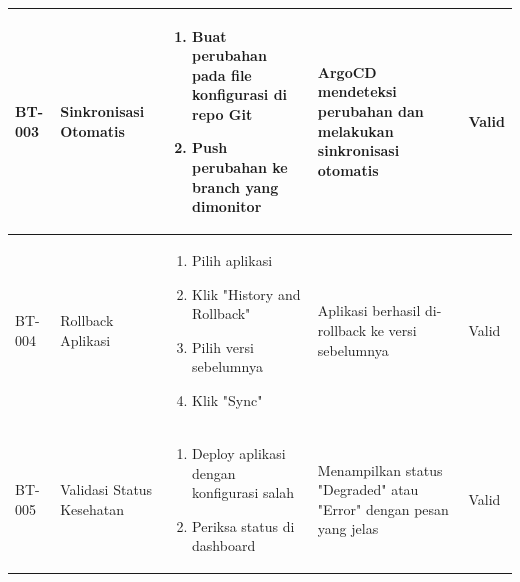 \begin{table}[h]
\begin{adjustbox}{width=\textwidth}
\begin{tabular}{|p{0.8cm}|p{2.2cm}|p{4cm}|p{3.5cm}|p{1.2cm}|}
            BT-003            & Sinkronisasi Otomatis     & \begin{enumerate}[leftmargin=*,noitemsep,topsep=0pt,label=\arabic*.,widest=99]
                                                                \item Buat perubahan pada file konfigurasi di repo Git
                                                                \item Push perubahan ke branch yang dimonitor
                                                            \end{enumerate} & ArgoCD mendeteksi perubahan dan melakukan sinkronisasi otomatis    & Valid                                                                          \\ \hline
            BT-004            & Rollback Aplikasi         & \begin{enumerate}[leftmargin=*,noitemsep,topsep=0pt,label=\arabic*.,widest=99]
                                                                \item Pilih aplikasi
                                                                \item Klik "History and Rollback"
                                                                \item Pilih versi sebelumnya
                                                                \item Klik "Sync"
                                                            \end{enumerate} & Aplikasi berhasil di-rollback ke versi sebelumnya                  & Valid                                                                          \\ \hline
            BT-005            & Validasi Status Kesehatan & \begin{enumerate}[leftmargin=*,noitemsep,topsep=0pt,label=\arabic*.,widest=99]
                                                                \item Deploy aplikasi dengan konfigurasi salah
                                                                \item Periksa status di dashboard
                                                            \end{enumerate} & Menampilkan status "Degraded" atau "Error" dengan pesan yang jelas & Valid                                                                          \\ \hline

\end{tabular}
\end{adjustbox}
\end{table}
